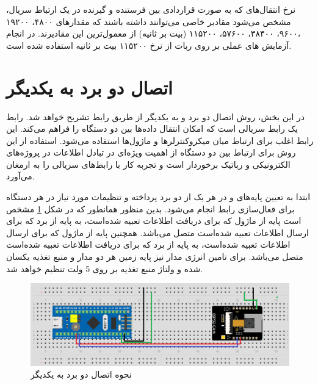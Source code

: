 نرخ انتقال‌های که به صورت قراردادی بین فرستنده و گیرنده در یک ارتباط سریال، مشخص می‌شود مقادیر خاصی می‌توانند داشته باشند که مقدارهای ۴۸۰۰، ۱۹۲۰۰ ،۹۶۰۰، ۳۸۴۰۰، ۵۷۶۰۰، ۱۱۵۲۰۰ (بیت بر ثانیه) از معمول‌ترین این مقادیرند. در انجام آزمایش های عملی بر روی ربات از نرخ ۱۱۵۲۰۰ بیت بر ثانیه استفاده شده است.


\section{اتصال دو برد به یکدیگر}


در این بخش، روش اتصال دو برد  و  به یکدیگر از طریق رابط  تشریح خواهد شد. رابط  یک رابط سریالی است که امکان انتقال داده‌ها بین دو دستگاه را فراهم می‌کند. این رابط اغلب برای ارتباط میان میکروکنترلرها و ماژول‌ها استفاده می‌شود. استفاده از این روش برای ارتباط بین دو دستگاه از اهمیت ویژه‌ای در تبادل اطلاعات در پروژه‌های الکترونیکی و رباتیک برخوردار است و تجربه کار با رابط‌های سریالی را به ارمغان می‌آورد.

ابتدا به تعیین پایه‌های  و  در هر یک از دو برد پرداخته و تنظیمات مورد نیاز در هر دستگاه برای فعال‌سازی رابط  انجام می‌شود. بدین منظور همانطور که در شکل 
\ref{اتصال دو برد}
مشخص است پایه
از ماژول
که برای دریافت اطلاعات تعبیه شده‌است، به پایه
از برد
که برای ارسال اطلاعات تعبیه شده‌است متصل می‌باشد. همچنین پایه
از ماژول
که برای ارسال اطلاعات تعبیه شده‌است، به پایه
از برد
که برای دریافت اطلاعات تعبیه شده‌است متصل می‌باشد. برای تامین انرژی مدار نیز پایه زمین هر دو مدار و منبع تغذیه یکسان شده و ولتاژ منبع تغذیه بر روی 5 ولت تنظیم خواهد شد.

\begin{figure}[H]
	\centering
	\includegraphics[width=1\textwidth]{./images/Chapter3/TwoBoardConnection}	
	\caption{نحوه اتصال دو برد  به یکدیگر}
	\label{اتصال دو برد}
\end{figure}

